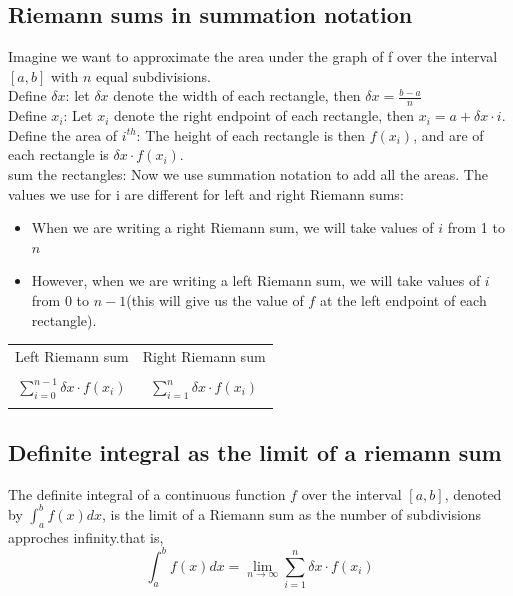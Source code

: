 \documentclass{article}
\begin{document}
            \subsection{Riemann sums in summation notation}
                Imagine we want to approximate the area under the graph of f over the interval \([a,b]\) with \(n\) equal subdivisions.\\
                Define \(\delta x\): let \(\delta x\) denote the width of each rectangle, then \(\delta x = \frac{b - a}{n}\)\\
                Define \(x_i\): Let \(x_i\) denote the right endpoint of each rectangle, then \(x_i = a + \delta x \cdot i \).\\ 
                Define the area of \(i^{th}\): The height of each rectangle is then \(f(x_i)\), and are of each rectangle is \(\delta x \cdot f(x_i)\).\\
                sum the rectangles: Now we use summation notation to add all the areas. The values we use for i are different for left and right Riemann sums: 
                \begin{itemize}
                    \item When we are writing a right Riemann sum, we will take values of \(i\) from 1 to \(n\)
                    \item However, when we are writing a left Riemann sum, we will take values of \(i\) from 0 to \(n - 1\)(this will give us the value of \(f\) at the left endpoint of each rectangle). 
                \end{itemize}
                \begin{center}
                    \begin{tabular}{ c c  } 
                        Left Riemann sum & Right Riemann sum  \\
                        \\
                        \(\sum_{i=0}^{n-1} \delta x \cdot f(x_i)\) & \(\sum_{i=1}^{n} \delta x \cdot f(x_i)\) \\\\ 
                       
                
                        
                    \end{tabular} 
                \end{center}
            \subsection{Definite integral as the limit of a riemann sum}
                The definite integral of a continuous function \(f\) over the interval \([a,b]\), denoted by \(\int_{a}^{b} f(x)dx\), is the limit of a Riemann sum as the number of subdivisions approches infinity.that is, 
                \[\int_{a}^{b} f(x)dx = \lim_{n \to \infty} \sum_{i = 1}^{n} \delta x \cdot f(x_i)\]
\end{document}
